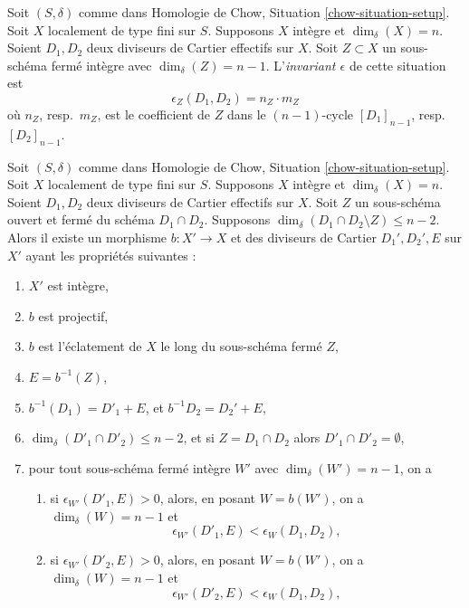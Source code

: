 \begin{definition}
\label{definition-epsilon}
Soit $(S, \delta)$ comme dans Homologie de Chow, Situation \ref{chow-situation-setup}.
Soit $X$ localement de type fini sur $S$.
Supposons $X$ intègre et $\dim_\delta(X) = n$.
Soient $D_1, D_2$ deux diviseurs de Cartier effectifs sur $X$.
Soit $Z \subset X$ un sous-schéma fermé intègre
avec $\dim_\delta(Z) = n - 1$. L'{\it invariant $\epsilon$}
de cette situation est
$$
\epsilon_Z(D_1, D_2) = n_Z \cdot m_Z
$$
où $n_Z$, resp.\ $m_Z$, est le coefficient de
$Z$ dans le $(n - 1)$-cycle $[D_1]_{n - 1}$, resp.\ $[D_2]_{n - 1}$.
\end{definition}

\begin{lemma}
\label{lemma-two-divisors}
Soit $(S, \delta)$ comme dans Homologie de Chow, Situation \ref{chow-situation-setup}.
Soit $X$ localement de type fini sur $S$.
Supposons $X$ intègre et $\dim_\delta(X) = n$.
Soient $D_1, D_2$ deux diviseurs de Cartier effectifs sur $X$.
Soit $Z$ un sous-schéma ouvert et fermé du schéma $D_1 \cap D_2$.
Supposons $\dim_\delta(D_1 \cap D_2 \setminus Z) \leq n - 2$.
Alors il existe un morphisme
$b : X' \to X$ et des diviseurs de Cartier
$D_1', D_2', E$ sur $X'$ ayant les propriétés suivantes :
\begin{enumerate}
\item $X'$ est intègre,
\item $b$ est projectif,
\item $b$ est l'éclatement de $X$ le long du sous-schéma fermé $Z$,
\item $E = b^{-1}(Z)$,
\item $b^{-1}(D_1) = D'_1 + E$, et $b^{-1}D_2 = D_2' + E$,
\item $\dim_\delta(D'_1 \cap D'_2) \leq n - 2$, et si
$Z = D_1 \cap D_2$ alors $D'_1 \cap D'_2 = \emptyset$,
\item pour tout sous-schéma fermé intègre $W'$
avec $\dim_\delta(W') = n - 1$, on a
\begin{enumerate}
\item si $\epsilon_{W'}(D'_1, E) > 0$, alors, en posant
$W = b(W')$, on a
$\dim_\delta(W) = n - 1$ et
$$
\epsilon_{W'}(D'_1, E) < \epsilon_W(D_1, D_2),
$$
\item si $\epsilon_{W'}(D'_2, E) > 0$, alors, en posant
$W = b(W')$, on a
$\dim_\delta(W) = n - 1$ et
$$
\epsilon_{W'}(D'_2, E) < \epsilon_W(D_1, D_2),
$$
\end{enumerate}
\end{enumerate}
\end{lemma}

